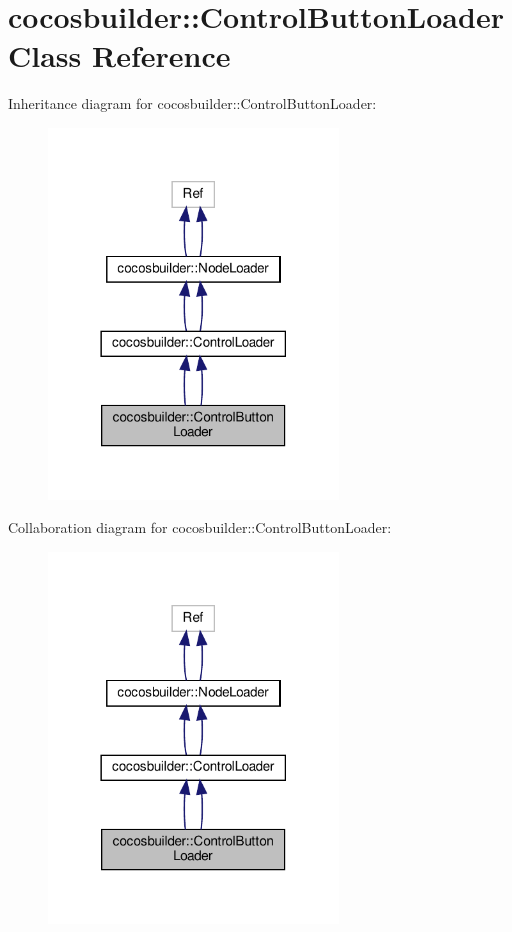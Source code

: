 \hypertarget{classcocosbuilder_1_1ControlButtonLoader}{}\section{cocosbuilder\+:\+:Control\+Button\+Loader Class Reference}
\label{classcocosbuilder_1_1ControlButtonLoader}


Inheritance diagram for cocosbuilder\+:\+:Control\+Button\+Loader\+:
\nopagebreak
\begin{figure}[H]
\begin{center}
\leavevmode
\includegraphics[width=218pt]{classcocosbuilder_1_1ControlButtonLoader__inherit__graph}
\end{center}
\end{figure}


Collaboration diagram for cocosbuilder\+:\+:Control\+Button\+Loader\+:
\nopagebreak
\begin{figure}[H]
\begin{center}
\leavevmode
\includegraphics[width=218pt]{classcocosbuilder_1_1ControlButtonLoader__coll__graph}
\end{center}
\end{figure}
